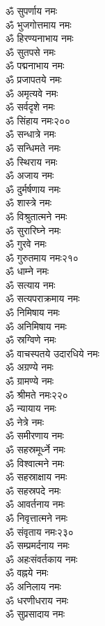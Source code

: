 \begin{center}
\begin{multicols}{2}
\begin{flushleft}
ॐ सुपर्णाय नमः\\
ॐ भुजगोत्तमाय नमः\\
ॐ हिरण्यनाभाय नमः\\
ॐ सुतपसे नमः\\
ॐ पद्मनाभाय नमः\\
ॐ प्रजापतये नमः\\
ॐ अमृत्यवे नमः\\
ॐ सर्वदृशे नमः\\
ॐ सिंहाय नमः\hfill २००\\
ॐ सन्धात्रे नमः\\
ॐ सन्धिमते नमः\\
ॐ स्थिराय नमः\\
ॐ अजाय नमः\\
ॐ दुर्मर्षणाय नमः\\
ॐ शास्त्रे नमः\\
ॐ विश्रुतात्मने नमः\\
ॐ सुरारिघ्ने नमः\\
ॐ गुरवे नमः\\
ॐ गुरुतमाय नमः\hfill २१०\\
ॐ धाम्ने नमः\\
ॐ सत्याय नमः\\
ॐ सत्यपराक्रमाय नमः\\
ॐ निमिषाय नमः\\
ॐ अनिमिषाय नमः\\
ॐ स्रग्विणे नमः\\
ॐ वाचस्पतये उदारधिये नमः\\
ॐ अग्रण्ये नमः\\
ॐ ग्रामण्ये नमः\\
ॐ श्रीमते नमः\hfill २२०\\
ॐ न्यायाय नमः\\
ॐ नेत्रे नमः\\
ॐ समीरणाय नमः\\
ॐ सहस्रमूर्ध्ने नमः\\
ॐ विश्वात्मने नमः\\
ॐ सहस्राक्षाय नमः\\
ॐ सहस्रपदे नमः\\
ॐ आवर्तनाय नमः\\
ॐ निवृत्तात्मने नमः\\
ॐ संवृताय नमः\hfill २३०\\
ॐ सम्प्रमर्दनाय नमः\\
ॐ अहःसंवर्तकाय नमः\\
ॐ वह्नये नमः\\
ॐ अनिलाय नमः\\
ॐ धरणीधराय नमः\\
ॐ सुप्रसादाय नमः\\

\end{flushleft}
\end{multicols}
\end{center}
